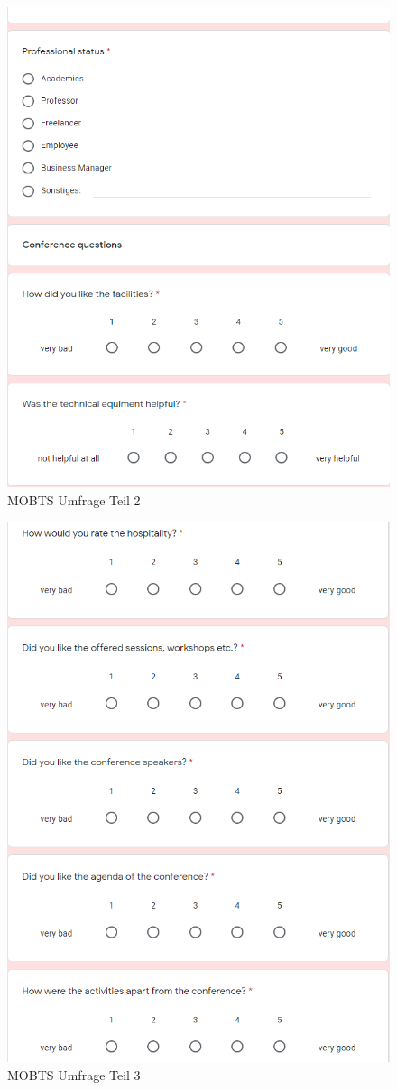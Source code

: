 \begin{figure}[h]
	\centering
	\includegraphics[width=10 cm]{img/survey2.png}
	\caption[MOBTS Umfrage]{MOBTS Umfrage Teil 2}
	\label{fig:survey2}
\end{figure}

\begin{figure}[h]
	\centering
	\includegraphics[width=10 cm]{img/survey3.png}
	\caption[MOBTS Umfrage]{MOBTS Umfrage Teil 3}
	\label{fig:survey3}
\end{figure}

